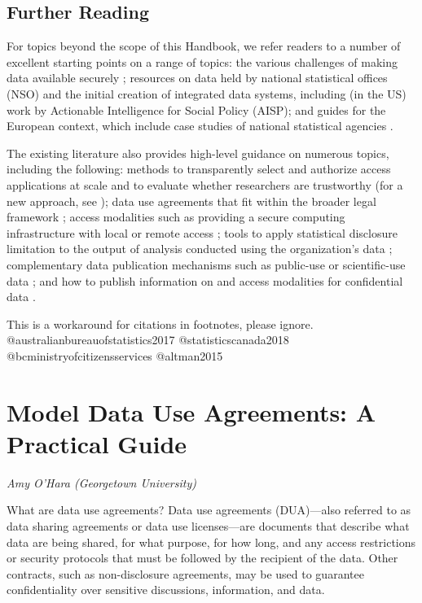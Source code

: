 \documentclass[
]{WileySix}
\begin{document}
\hypertarget{further-reading}{%
\subsection{Further Reading}\label{further-reading}}

For topics beyond the scope of this Handbook, we refer readers to a number of excellent starting points on a range of topics: the various challenges of making data available securely \citep[see f.i.][]{reuter2010, harron2017, adrfnetwork2018, futureofprivacyforum2017}; resources on data held by national statistical offices (NSO) and the initial creation of integrated data systems, including (in the US) work by Actionable Intelligence for Social Policy (AISP); and guides for the European context, which include case studies of national statistical agencies \citep{oecd2014, bujnowska2019}.

The existing literature also provides high-level guidance on numerous topics, including the following: methods to transparently select and authorize access applications at scale and to evaluate whether researchers are trustworthy (for a new approach, see \citet{levenstein2018}); data use agreements that fit within the broader legal framework \citep[some limited guidance provided by][]{kanous2015, kuchinke2016, alter2018}; access modalities such as providing a secure computing infrastructure with local or remote access \citep{weinberg2007, vilhuber2013, vilhuber2017}; tools to apply statistical disclosure limitation to the output of analysis conducted using the organization's data \citep{liu2020, dupriez2010, duncan2011}; complementary data publication mechanisms such as public-use or scientific-use data \citep{bujnowska2019}; and how to publish information on and access modalities for confidential data \citep{abowd2012}.

\begin{invisible}
This is a workaround for citations in footnotes, please ignore.
@australianbureauofstatistics2017 @statisticscanada2018
@bcministryofcitizensservices @altman2015
\end{invisible}

\hypertarget{dua}{%
\section{Model Data Use Agreements: A Practical Guide}\label{dua}}

\emph{Amy O'Hara (Georgetown University)}

What are data use agreements? Data use agreements (DUA)---also referred to as data sharing agreements or data use licenses---are documents that describe what data are being shared, for what purpose, for how long, and any access restrictions or security protocols that must be followed by the recipient of the data. Other contracts, such as non-disclosure agreements, may be used to guarantee confidentiality over sensitive discussions, information, and data.
\end{document}
